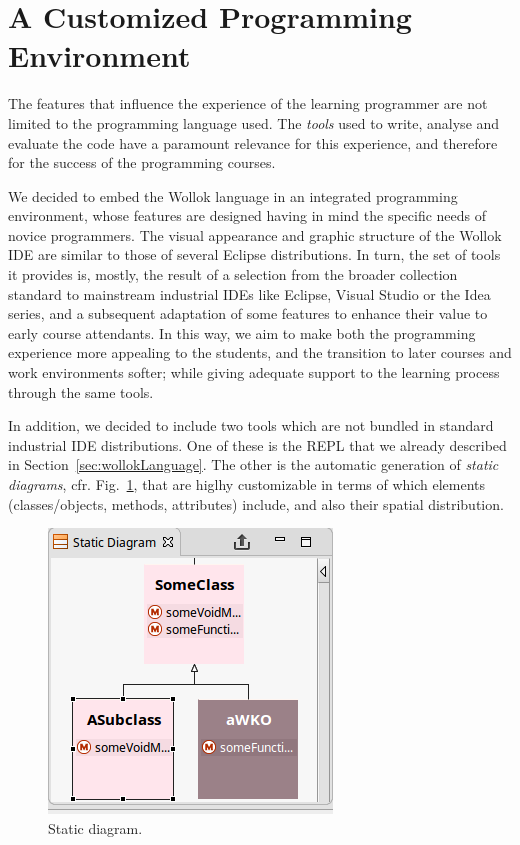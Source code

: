 \section{A Customized Programming Environment}
\label{sec:environment}

The features that influence the experience of the learning programmer are not limited to the programming language used. 
The \emph{tools} used to write, analyse and evaluate the code have a paramount relevance for this experience, and therefore for the success of the programming courses.

We decided to embed the Wollok language in an integrated programming environment, whose features are designed having in mind the specific needs of novice programmers.
The visual appearance and graphic structure of the Wollok IDE are similar to those of several Eclipse distributions. 
In turn, the set of tools it provides is, mostly, the result of a selection from the broader collection standard to mainstream industrial IDEs like Eclipse, Visual Studio or the Idea series, and a subsequent adaptation of some features to enhance their value to early course attendants.
In this way, we aim to make both the programming experience more appealing to the students, and the transition to later courses and work environments softer; while giving adequate support to the learning process through the same tools.

\medskip
In addition, we decided to include two tools which are not bundled in standard industrial IDE distributions. 
One of these is the REPL that we already described in Section~\ref{sec:wollokLanguage}.
The other is the automatic generation of \emph{static diagrams}, cfr. Fig.~\ref{fig:outline}, that are higlhy customizable in terms of which elements (classes/objects, methods, attributes) include, and also their spatial distribution.

\begin{figure}[ht]
 \centering
 \includegraphics[scale=0.5]{../images/staticDiagram.png}
 \caption{\small Static diagram.}
 \label{fig:outline}
\end{figure}


